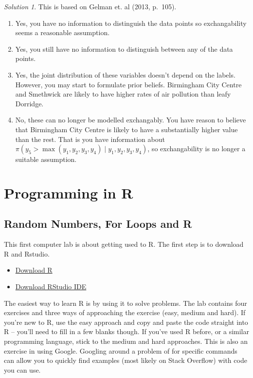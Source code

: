 \documentclass[
]{book}
\providecommand{\tightlist}{%
  \setlength{\itemsep}{0pt}\setlength{\parskip}{0pt}}
\theoremstyle{definition}
\theoremstyle{definition}
\theoremstyle{definition}
\theoremstyle{definition}
\theoremstyle{remark}
\newtheorem*{solution}{Solution}
\begin{document}
\begin{solution}

This is based on Gelman et. al (2013, p.~105).

\begin{enumerate}
\def\labelenumi{\arabic{enumi}.}
\tightlist
\item
  Yes, you have no information to distinguish the data points so exchangability seems a reasonable assumption.
\item
  Yes, you still have no information to distinguish between any of the data points.
\item
  Yes, the joint distribution of these variables doesn't depend on the labels. However, you may start to formulate prior beliefs. Birmingham City Centre and Smethwick are likely to have higher rates of air pollution than leafy Dorridge.
\item
  No, these can no longer be modelled exchangably. You have reason to believe that Birmingham City Centre is likely to have a substantially higher value than the rest. That is you have information about \(\pi(y_5 > \max(y_1, y_2, y_3, y_4) \mid y_1, y_2, y_3, y_4)\), so exchangability is no longer a suitable assumption.
\end{enumerate}

\end{solution}

\hypertarget{programming-in-r}{%
\chapter{Programming in R}\label{programming-in-r}}

\hypertarget{random-numbers-for-loops-and-r}{%
\section{Random Numbers, For Loops and R}\label{random-numbers-for-loops-and-r}}

This first computer lab is about getting used to R. The first step is to download R and Rstudio.

\begin{itemize}
\tightlist
\item
  \href{https://www.r-project.org}{Download R}
\item
  \href{https://posit.co/downloads/}{Download RStudio IDE}
\end{itemize}

The easiest way to learn R is by using it to solve problems. The lab contains four exercises and three ways of approaching the exercise (easy, medium and hard). If you're new to R, use the easy approach and copy and paste the code straight into R -- you'll need to fill in a few blanks though. If you've used R before, or a similar programming language, stick to the medium and hard approaches. This is also an exercise in using Google. Googling around a problem of for specific commands can allow you to quickly find examples (most likely on Stack Overflow) with code you can use.
\end{document}
